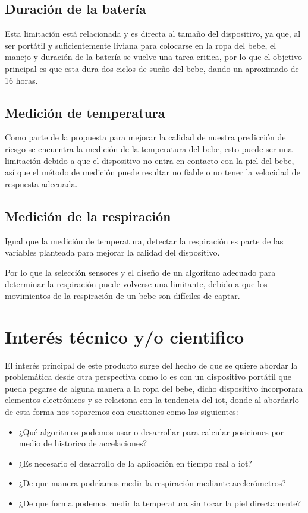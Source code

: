 \subsection{Duración de la batería}

Esta limitación está relacionada y es directa al tamaño del dispositivo, ya que, al ser portátil y suficientemente liviana para colocarse en la ropa del bebe, el manejo y duración de la batería se vuelve una tarea critica, por lo que el objetivo principal es que esta dura dos ciclos de sueño del bebe, dando un aproximado de 16 horas.

\subsection{Medición de temperatura}

Como parte de la propuesta para mejorar la calidad de nuestra predicción de riesgo se encuentra la medición de la temperatura del bebe, esto puede ser una limitación debido a que el dispositivo no entra en contacto con la piel del bebe, así que el método de medición puede resultar no fiable o no tener la velocidad de respuesta adecuada.

\subsection{Medición de la respiración}

Igual que la medición de temperatura, detectar la respiración es parte de las variables planteada para mejorar la calidad del dispositivo.

Por lo que la selección sensores y el diseño de un algoritmo adecuado para determinar la respiración puede volverse una limitante, debido a que los movimientos de la respiración de un bebe son difíciles de captar.

\section{Interés técnico y/o cientifico}
El interés principal de este producto surge del hecho de que se quiere abordar la problemática desde otra perspectiva como lo es con un dispositivo portátil que pueda pegarse de alguna manera a la ropa del bebe, dicho dispositivo incorporara elementos electrónicos y se relaciona con la tendencia del \acrshort{iot}, donde al abordarlo de esta forma nos toparemos con cuestiones como las siguientes:

\begin{itemize}
    \item ¿Qué algoritmos podemos usar o desarrollar para calcular posiciones por medio de historico de accelaciones?
    \item ¿Es necesario el desarrollo de la aplicación en tiempo real a \acrshort{iot}?
    \item ¿De que manera podríamos medir la respiración mediante acelerómetros?
    \item ¿De que forma podemos medir la temperatura sin tocar la piel directamente?
\end{itemize}

